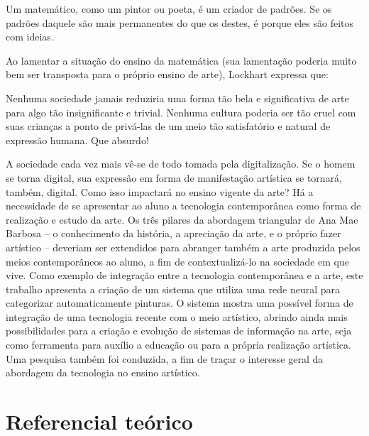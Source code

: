 \documentclass[12pt, a4paper, titlepage]{article}
\begin{document}
\begin{displayquote}
Um matemático, como um pintor ou poeta, é um criador de padrões. Se os padrões daquele são mais permanentes do que os destes, é porque eles são feitos com ideias.
\end{displayquote}

Ao lamentar a situação do ensino da matemática (sua lamentação poderia muito bem ser transposta para o próprio ensino de arte), Lockhart 
\cite{lockhart_lament} expressa que:

\begin{displayquote}
Nenhuma sociedade jamais reduziria uma forma tão bela e significativa de arte para algo tão insignificante e trivial. Nenhuma cultura poderia ser tão cruel com suas crianças a ponto de privá-las de um meio tão satisfatório e natural de expressão humana. Que absurdo!
\end{displayquote}

A sociedade cada vez mais vê-se de todo tomada pela digitalização. Se o homem se torna digital, sua expressão em forma de 
manifestação artística se tornará, também, digital. Como isso impactará no ensino vigente da arte?
Há a necessidade de se apresentar ao aluno a tecnologia contemporânea como forma de realização e estudo da arte.
Os três pilares da abordagem triangular de Ana Mae Barbosa -- o conhecimento da história, a apreciação da arte, e o próprio fazer artístico --
deveriam ser extendidos para abranger também a arte produzida pelos meios contemporâneos ao aluno, a fim de contextualizá-lo na sociedade em que vive.
Como exemplo de integração entre a tecnologia contemporânea e a arte, este trabalho apresenta a criação de um sistema que utiliza uma rede neural para categorizar automaticamente pinturas. 
O sistema mostra uma possível forma de integração de uma tecnologia recente com o meio artístico, abrindo ainda mais possibilidades para
a criação e evolução de sistemas de informação na arte, seja como ferramenta para auxílio a educação ou para a própria realização artística. 
Uma pesquisa também foi conduzida, a fim de traçar o interesse geral da abordagem da tecnologia no ensino artístico.

\section{Referencial teórico}

\printbibliography
\end{document}
